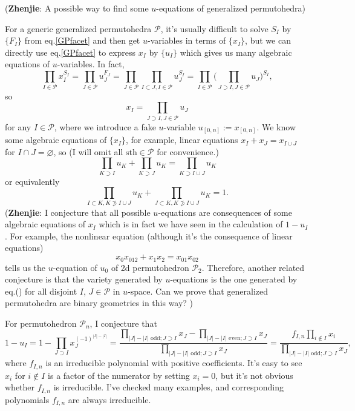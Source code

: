 \documentclass[hidelinks,12pt]{article}
\renewcommand{\theequation}{\thesection.\arabic{equation}}
\renewcommand{\theequation}{\arabic{equation}}
\begin{document}
\begin{enumerate}
({\bf Zhenjie}: A possible way to find some $u$-equations of generalized permutohedra)

For a generic generalized permutohedra $\mathscr P$, it's usually difficult to solve $S_I$ by $\{F_I\}$  from eq.\eqref{GPfacet} and then get $u$-variables in terms of $\{x_I\}$, but we can directly use eq.\eqref{GPfacet} to express $x_I$ by $\{u_I\}$ which gives us many algebraic equations of $u$-variables. In fact,
\[
\prod_{I\in \mathscr P}x_I^{S_I}=\prod_{J\in \mathscr P}u_J^{F_J}=\prod_{J\in\mathscr P}\prod_{I\subset J,I\in \mathscr P}u_J^{S_I}=\prod_{I\in\mathscr P}\biggl(\prod_{J\supset I,J\in\mathscr P}u_J\bigg)^{S_I},
\]
so
\begin{equation}
x_I=\prod_{J\supset I,J\in\mathscr P}u_J
\end{equation}
for any $I\in \mathscr P$, where we introduce a fake $u$-variable 
$u_{[0,n]}:=x_{[0,n]}$. We know some algebraic equations of $\{x_I\}$, 
for example, linear equations $x_I+x_J=x_{I\cup J}$ for $I\cap J=\varnothing$, 
so (I will omit all $\text{sth}\in \mathscr P$ for convenience.)
\begin{equation*}
	\prod_{K\supset I}u_K+\prod_{K\supset J}u_K=\prod_{K\supset I\cup J}u_K
\end{equation*}
or equivalently
\begin{equation}
\prod_{I\subset K,K\not\supset I\cup J}u_K +
\prod_{J\subset K,K\not\supset I\cup J}u_K = 1.
\end{equation}
({\bf Zhenjie}: I conjecture that all possible $u$-equations are consequences of 
some algebraic equations of $x_I$ which is in fact we have seen in 
the calculation of $1-u_I$. For example, the nonlinear equation (although it's
the consequence of linear equations)
\[
	x_0x_{012}+x_1x_2=x_{01}x_{02}
\]
tells us the $u$-equation of $u_0$ of 2d permutohedron $\mathscr P_2$. Therefore,
another related conjecture is that the variety generated by $u$-equations 
is the one generated by eq.(\theequation) for all disjoint $I$, $J\in \mathscr P$ 
in $u$-space. Can we prove that generalized permutohedra are binary geometries in
this way?
)

For permutohedron $\mathscr P_n$, I conjecture that
\[
1-u_I=1-\prod_{J\supset I}x_J^{(-1)^{|J|-|I|}}=\frac{\prod_{|J|-|I| \text{ odd}; J\supset I}x_J-\prod_{|J|-|I| \text{ even}; J\supset I}x_J}{\prod_{|J|-|I| \text{ odd}; J\supset I}x_J}
=\frac{f_{I,n}\prod_{i\not\in I}x_i}{\prod_{|J|-|I| \text{ odd}; J\supset I}x_J},
\]
where $f_{I,n}$ is an irreducible polynomial with positive coefficients. It's easy to see $x_i$ for $i\not\in I$ is a factor of the numerator by setting $x_i=0$, but it's not obvious whether $f_{I,n}$ is irreducible. I've checked many examples, and corresponding polynomials $f_{I,n}$ are always irreducible.


\end{enumerate}
\end{document}
